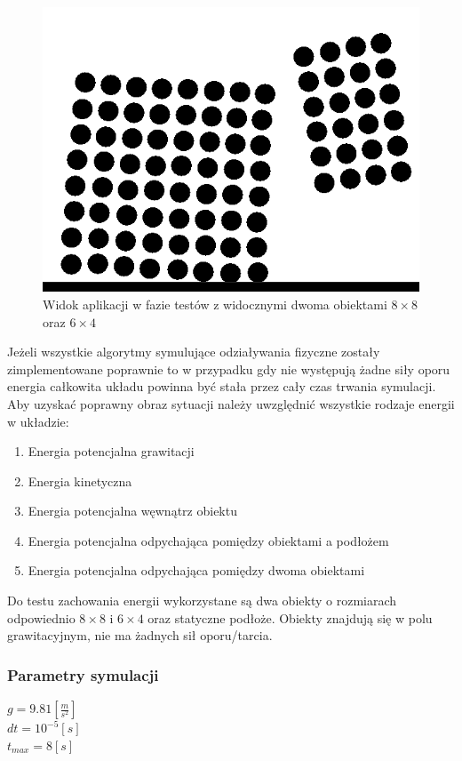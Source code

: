\documentclass[12pt, letterpaper]{report}
\begin{document}
    \begin{figure}
        \includegraphics[width=0.9\linewidth]{objects_raw} 
        \caption{Widok aplikacji w fazie testów z widocznymi dwoma obiektami $8 \times 8$ oraz $6 \times 4$}
    \end{figure}
    Jeżeli wszystkie algorytmy symulujące odziaływania fizyczne zostały zimplementowane poprawnie 
    to w przypadku gdy nie występują żadne siły oporu energia całkowita układu powinna 
    być stała przez cały czas trwania symulacji. 
    Aby uzyskać poprawny obraz sytuacji należy uwzględnić
    wszystkie rodzaje energii w układzie: 
    \begin{enumerate}
        \item Energia potencjalna grawitacji
        \item Energia kinetyczna
        \item Energia potencjalna węwnątrz obiektu
        \item Energia potencjalna odpychająca pomiędzy obiektami a podłożem
        \item Energia potencjalna odpychająca pomiędzy dwoma obiektami
    \end{enumerate}
    Do testu zachowania energii wykorzystane są 
    dwa obiekty o rozmiarach odpowiednio $8 \times 8$ i $6 \times 4$ oraz statyczne podłoże. Obiekty
    znajdują się w polu grawitacyjnym, nie ma żadnych sił oporu/tarcia.

    \subsubsection{Parametry symulacji}
    $g = 9.81 [\frac{m}{s^2}]$\\
    $dt = 10^{-5} [s]$\\
    $t_{max} = 8 [s]$\\ \\ \\ \\
\end{document}
